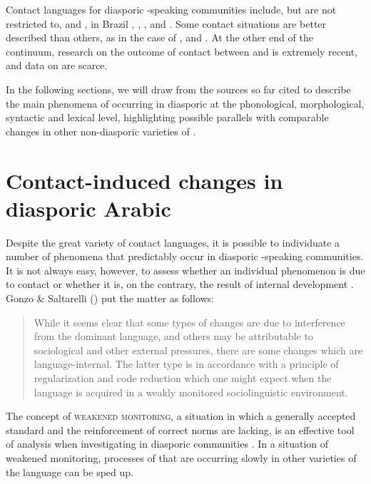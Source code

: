 \documentclass[output=paper]{langsci/langscibook}
\begin{document}
Contact languages for diasporic -speaking communities include, but are not restricted to,  \citep{Rouchdy_arabic_1992} and   \citep{AbuHaidar2012},  in Brazil \citep[292]{Versteegh2014book},   \citep{BoumansCaubet2000},  \citep{Boumans2000,Boumans2004,Boumans2007,BoumansCaubet2000,BoumansdeRuiter2002},  \citep{Vicente2005,Vicente2007} and  \citep{Danna2017book,Danna2018Chebba}. Some contact situations are better described than others, as in the case of ,  and . At the other end of the continuum, research on the outcome of contact between  and  is extremely recent, and data on  are scarce.

In the following sections, we will draw from the sources so far cited to describe the main phenomena of  occurring in diasporic  at the phonological, morphological, syntactic and lexical level, highlighting possible parallels with comparable changes in other non-diasporic varieties of .

\section{Contact-induced changes in diasporic Arabic}

Despite the great variety of contact languages, it is possible to individuate a number of phenomena that predictably occur in diasporic -speaking communities. It is not always easy, however, to assess whether an individual phenomenon is due to contact or whether it is, on the contrary, the result of internal development \citep[377]{Romaine1989}. Gonzo \& Saltarelli (\citeyear[177]{GonzoSaltarelli1977}) put the matter as follows:

\begin{quote}While it seems clear that some types of changes are due to interference from the dominant language, and others may be attributable to sociological and other external pressures, there are some changes which are language-internal. The latter type is in accordance with a principle of regularization and code reduction which one might expect when the language is acquired in a weakly monitored sociolinguistic environment.\end{quote}

The concept of \textsc{weakened} \textsc{monitoring}, a situation in which a generally accepted standard and the reinforcement of correct norms are lacking, is an effective tool of analysis when investigating  in diasporic communities \citep{GonzoSaltarelli1977,GonzoSaltarelli1983}. In a situation of weakened monitoring, processes of  that are occurring slowly in other varieties of the language can be sped up.
\end{document}
